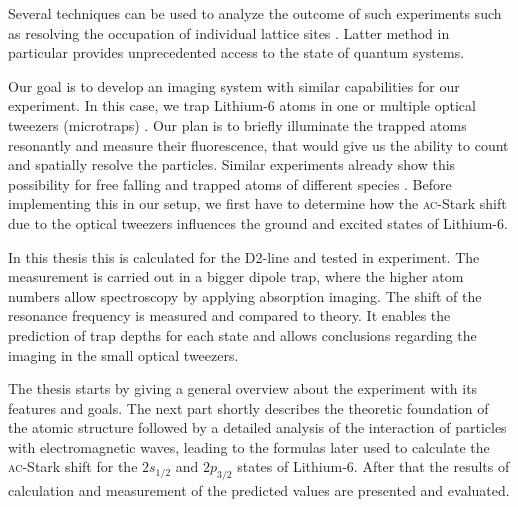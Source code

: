 Several techniques can be used to analyze the outcome of such experiments \cite{ketterle} such as resolving the occupation of individual lattice sites \cite{greiner2, bloch2,greiner3,kuhr}. Latter method in particular provides unprecedented access to the state of quantum systems.

Our goal is to develop an imaging system with similar capabilities for our experiment. In this case, we trap Lithium-6 atoms in one or multiple optical tweezers (microtraps) \cite{doublewell}. Our plan is to briefly illuminate the trapped atoms resonantly and measure their fluorescence, that would give us the ability to count and spatially resolve the particles. Similar experiments already show this possibility for free falling and trapped atoms of different species \cite{schmiedmayer,andersen}. Before implementing this in our setup, we first have to determine how the \textsc{ac}-Stark shift due to the optical tweezers influences the ground and excited states of Lithium-6.

In this thesis this is calculated for the D2-line and tested in experiment. The measurement is carried out in a bigger dipole trap, where the higher atom numbers allow spectroscopy by applying absorption imaging. The shift of the resonance frequency is measured and compared to theory. It enables the prediction of trap depths for each state and allows conclusions regarding the imaging in the small optical tweezers. 

The thesis starts by giving a general overview about the experiment with its features and goals. The next part shortly describes the theoretic foundation of the atomic structure followed by a detailed analysis of the interaction of particles with electromagnetic waves, leading to the formulas later used to calculate the \textsc{ac}-Stark shift for the $2s_{1/2}$ and $2p_{3/2}$ states of Lithium-6. After that the results of calculation and measurement of the predicted values are presented and evaluated.

